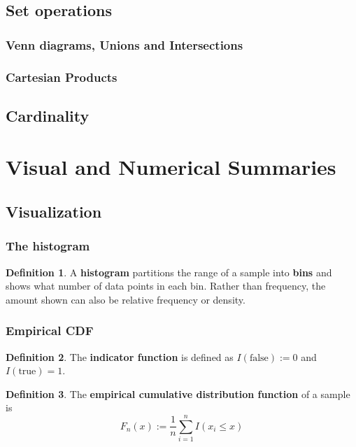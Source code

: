 \documentclass[12pt]{article}
\theoremstyle{definition}
\newtheorem*{defn*}{Definition}
\begin{document}
\subsection{Set operations}

\subsubsection{Venn diagrams, Unions and Intersections}

\subsubsection{Cartesian Products}

\subsection{Cardinality}

\section{Visual and Numerical Summaries}

\subsection{Visualization}

\subsubsection{The histogram}

\begin{defn*}
  A \textbf{histogram} partitions the range of a sample into \textbf{bins} and shows what number of data points in each bin.
  Rather than frequency, the amount shown can also be relative frequency or density.
\end{defn*}

\subsubsection{Empirical CDF}

\begin{defn*}
  The \textbf{indicator function} is defined as $I(\text{false}) := 0$ and $I(\text{true}) = 1$.
\end{defn*}

\begin{defn*}
  The \textbf{empirical cumulative distribution function} of a sample is
  $$F_n(x) := \frac{1}{n}\sum_{i = 1}^nI(x_i \leq x)$$
\end{defn*}
\end{document}
